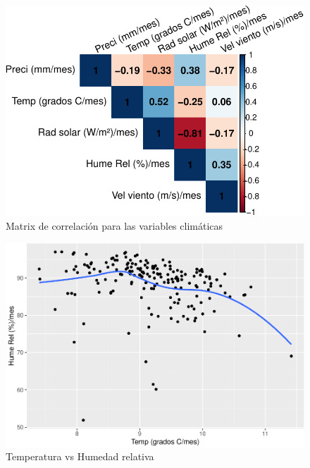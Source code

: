 \documentclass[conference,final,]{IEEEtran}
\makeatletter
\def\maxwidth{\ifdim\Gin@nat@width>\linewidth\linewidth
\else\Gin@nat@width\fi}
\let\Oldincludegraphics\includegraphics
\renewcommand{\includegraphics}[1]{\Oldincludegraphics[width=\maxwidth]{#1}}
\makeatother
\begin{document}
\begin{figure}
\centering
\includegraphics{Hidrology_files/figure-latex/unnamed-chunk-18-1.pdf}
\caption{Matrix de correlación para las variables climáticas}
\end{figure}

\begin{figure}
\centering
\includegraphics{Hidrology_files/figure-latex/unnamed-chunk-19-1.pdf}
\caption{Temperatura vs Humedad relativa}
\end{figure}
\end{document}
